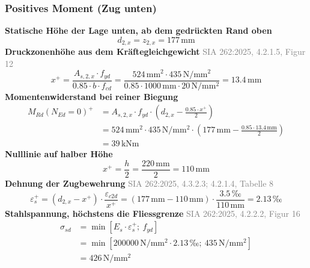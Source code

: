 \documentclass[11pt,a4paper]{article}
\newcommand{\normref}[1]{{\small\textcolor{gray}{#1}}}
\begin{document}
\subsubsection{Positives Moment (Zug unten)}
\noindent\textbf{Statische Höhe der Lage unten, ab dem gedrückten Rand oben}
\begin{equation*}
d_{2,x} = z_{2,x} = 177\,\mathrm{mm}
\end{equation*}
\noindent\textbf{Druckzonenhöhe aus dem Kräftegleichgewicht} \hfill \normref{SIA 262:2025, 4.2.1.5, Figur 12}
\begin{equation*}
x^{+} = \frac{A_{s,2,x} \cdot f_{yd}}{0.85 \cdot b \cdot f_{cd}} = \frac{524\,\mathrm{mm}^{2} \cdot 435\,\mathrm{N}/\mathrm{mm}^{2}}{0.85 \cdot 1000\,\mathrm{mm} \cdot 20\,\mathrm{N}/\mathrm{mm}^{2}} = 13.4\,\mathrm{mm}
\end{equation*}
\noindent\textbf{Momentenwiderstand bei reiner Biegung}
\begin{equation*}
\begin{aligned}
  M_{Rd}(N_{Ed}=0)^{+} &= A_{s,2,x} \cdot f_{yd} \cdot \left(d_{2,x} - \frac{0.85 \cdot x^{+}}{2}\right) \\
  &= 524\,\mathrm{mm}^{2} \cdot 435\,\mathrm{N}/\mathrm{mm}^{2} \cdot \left(177\,\mathrm{mm} - \frac{0.85 \cdot 13.4\,\mathrm{mm}}{2}\right) \\
  &= 39\,\mathrm{kNm}
\end{aligned}
\end{equation*}
\noindent\textbf{Nulllinie auf halber Höhe}
\begin{equation*}
x^{+} = \frac{h}{2} = \frac{220\,\mathrm{mm}}{2} = 110\,\mathrm{mm}
\end{equation*}
\noindent\textbf{Dehnung der Zugbewehrung} \hfill \normref{SIA 262:2025, 4.3.2.3; 4.2.1.4, Tabelle 8}
\begin{equation*}
\varepsilon_s^{+} = \left(d_{2,x} - x^{+}\right) \cdot \frac{\varepsilon_{c2d}}{x^{+}} = \left(177\,\mathrm{mm} - 110\,\mathrm{mm}\right) \cdot \frac{3.5\,\text{‰}}{110\,\mathrm{mm}} = 2.13\,\text{‰}
\end{equation*}
\noindent\textbf{Stahlspannung, höchstens die Fliessgrenze} \hfill \normref{SIA 262:2025, 4.2.2.2, Figur 16}
\begin{equation*}
\begin{aligned}
  \sigma_{sd} &= \min\left[E_s \cdot \varepsilon_s^{+};\ f_{yd}\right] \\
  &= \min\left[200000\,\mathrm{N}/\mathrm{mm}^{2} \cdot 2.13\,\text{‰};\ 435\,\mathrm{N}/\mathrm{mm}^{2}\right] \\
  &= 426\,\mathrm{N}/\mathrm{mm}^{2}
\end{aligned}
\end{equation*}
\end{document}
